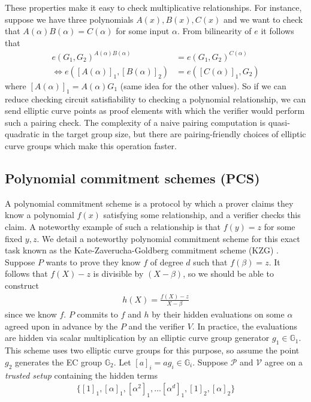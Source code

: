 These properties make it easy to check multiplicative relationships. For instance, suppose we have three polynomials $A(x), B(x), C(x)$ and we want to check that $A(\alpha)B(\alpha) = C(\alpha)$ for some input $\alpha$. From bilinearity of $e$ it follows that 
\begin{align*}
e(G_1, G_2)^{A(\alpha)B(\alpha)} &= e(G_1, G_2)^{C(\alpha)} \\
\Leftrightarrow e([A(\alpha)]_1, [B(\alpha)]_2) &= e([C(\alpha)]_1, G_2)
\end{align*}
where $[A(\alpha)]_1 = A(\alpha)G_1$ (same idea for the other values). So if we can reduce checking circuit satisfiability to checking a polynomial relationship, we can send elliptic curve points as proof elements with which the verifier would perform such a pairing check. The complexity of a naive pairing computation is quasi-quadratic in the target group size, but there are pairing-friendly choices of elliptic curve groups which make this operation faster. 

\subsection{Polynomial commitment schemes (PCS)}
\noindent A polynomial commitment scheme is a protocol by which a prover claims they know a polynomial $f(x)$ satisfying some relationship, and a verifier checks this claim. A noteworthy example of such a relationship is that $f(y) = z$ for some fixed $y, z$. We detail a noteworthy polynomial commitment scheme for this exact task known as the Kate-Zaverucha-Goldberg commitment scheme (KZG) \cite{kzg}. Suppose $P$ wants to prove they know $f$ of degree $d$ such that $f(\beta) = z$. It follows that $f(X) - z$ is divisible by $(X - \beta)$, so we should be able to construct
\begin{align}
h(X) = \frac{f(X) - z}{X - \beta}
\end{align}
since we know $f$. $P$ commits to $f$ and $h$ by their hidden evaluations on some $\alpha$ agreed upon in advance by the $P$ and the verifier $V$. In practice, the evaluations are hidden via scalar multiplication by an elliptic curve group generator $g_1 \in \mathbb{G}_1$. This scheme uses two elliptic curve groups for this purpose, so assume the point $g_2$ generates the EC group $\mathbb{G}_2$. Let $[a]_i = ag_i \in \mathbb{G}_i$. Suppose $\mathcal{P}$ and $\mathcal{V}$ agree on a \textit{trusted setup} containing the hidden terms 
\begin{align}
\{[1]_1, [\alpha]_1, [\alpha^2]_1, \dots [\alpha^{d}]_1, [1]_2, [\alpha]_2\}
\end{align}

